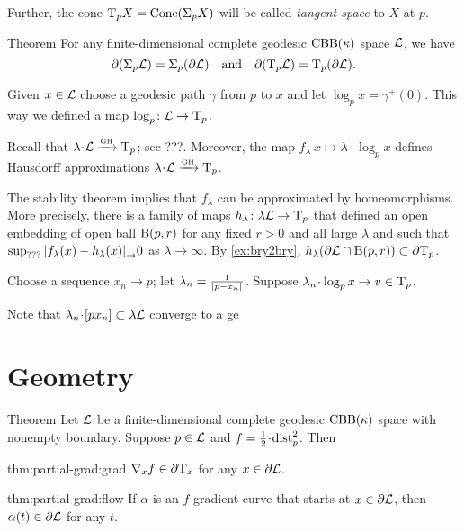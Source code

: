 Further, the cone $\mathrm{T}_pX=\mathop{\rm Cone}\nolimits(\Sigma_pX)$ will be called \emph{tangent space} to $X$ at $p$.

\begin{thm}{Theorem}\label{thm:partial-Sigma}
For any finite-dimensional complete geodesic $\mathrm{CBB}(\kappa)$ space $\mathcal{L}$, we have
\[\partial (\Sigma_p\mathcal{L})=\Sigma_p(\partial\mathcal{L})
\quad\text{and}\quad
\partial(\mathrm{T}_p\mathcal{L})=\mathrm{T}_p(\partial\mathcal{L}).\]
\end{thm}

Given $x\in\mathcal{L}$ choose a geodesic path $\gamma$ from $p$ to $x$
and let $\log_px=\gamma^+(0)$.
This way we defined a map $\log_p\colon\mathcal{L}\to \mathrm{T}_p$.

Recall that $\lambda\cdot \spc{L}\GHto \T_p$; see ???.
Moreover, the map $f_\lambda\:x\mapsto \lambda\cdot\log_px$ defines Hausdorff approximations $\lambda\cdot \spc{L}\GHto \T_p$.

The stability theorem implies that $f_\lambda$ can be approximated by homeomorphisms.
More precisely, there is a family of maps $h_\lambda\colon\lambda\mathcal{L}\to \mathrm{T}_p$
that defined an open embedding of open ball $\mathrm{B}{}(p,r)$ for any fixed $r>0$ and all large $\lambda$
and such that $\sup_{???}\dist{f_\lambda(x)}{h_\lambda(x)}\to 0$ as $\lambda\to\infty$.
By \ref{ex:bry2bry}, $h_\lambda(\partial \mathcal{L}\cap \mathrm{B}{}(p,r))\subset \partial\mathrm{T}_p$. 

Choose a sequence $x_n\to p$;
let $\lambda_n=\tfrac1{\dist{p}{x_n}{}}$.
Suppose $\lambda_n\cdot \log_px\to v\in\T_p$.



Note that $\lambda_n\cdot [p x_n]\subset \lambda\spc{L}$ converge to a ge

\qeds

\section{Geometry}

\begin{thm}{Theorem}\label{thm:partial-grad}
Let $\mathcal{L}$ be a finite-dimensional complete geodesic $\mathrm{CBB}(\kappa)$ space with nonempty boundary.
Suppose $p\in \mathcal{L}$ and $f\z=\tfrac12\cdot\distfun_p^2$.
Then

\begin{subthm}{thm:partial-grad:grad}
$\nabla_xf\in \partial\mathrm{T}_x$ for any $x\in\partial \mathcal{L}$.
\end{subthm}

\begin{subthm}{thm:partial-grad:flow}
If $\alpha$ is an $f$-gradient curve that starts at $x\in \partial \mathcal{L}$, then $\alpha(t)\in \partial \mathcal{L}$ for any $t$.
\end{subthm}

\end{thm}


